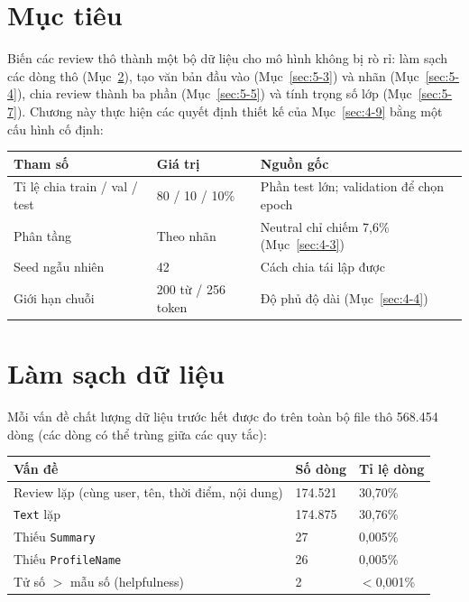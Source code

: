 \section{Mục tiêu}
\label{sec:5-1}

Biến các review thô thành một bộ dữ liệu cho mô hình không bị rò rỉ: làm sạch các dòng thô (Mục~\ref{sec:5-2}), tạo văn bản đầu vào (Mục~\ref{sec:5-3}) và nhãn (Mục~\ref{sec:5-4}), chia review thành ba phần (Mục~\ref{sec:5-5}) và tính trọng số lớp (Mục~\ref{sec:5-7}). Chương này thực hiện các quyết định thiết kế của Mục~\ref{sec:4-9} bằng một cấu hình cố định:

\begin{center}
\begin{tabular}{@{}p{5.2cm}p{3cm}p{5.8cm}@{}}
    \toprule
    Tham số & Giá trị & Nguồn gốc \\
    \midrule
    Tỉ lệ chia train / val / test & 80 / 10 / 10\% & Phần test lớn; validation để chọn epoch \\
    Phân tầng & Theo nhãn & Neutral chỉ chiếm 7,6\% (Mục~\ref{sec:4-3}) \\
    Seed ngẫu nhiên & 42 & Cách chia tái lập được \\
    Giới hạn chuỗi & 200 từ / 256 token & Độ phủ độ dài (Mục~\ref{sec:4-4}) \\
    \bottomrule
\end{tabular}
\end{center}

\section{Làm sạch dữ liệu}
\label{sec:5-2}

Mỗi vấn đề chất lượng dữ liệu trước hết được đo trên toàn bộ file thô 568.454 dòng (các dòng có thể trùng giữa các quy tắc):

\begin{center}
\begin{tabular}{@{}p{7cm}p{3cm}p{3cm}@{}}
    \toprule
    Vấn đề & Số dòng & Tỉ lệ dòng \\
    \midrule
    Review lặp (cùng user, tên, thời điểm, nội dung) & 174.521 & 30,70\% \\
    \texttt{Text} lặp & 174.875 & 30,76\% \\
    Thiếu \texttt{Summary} & 27 & 0,005\% \\
    Thiếu \texttt{ProfileName} & 26 & 0,005\% \\
    Tử số $>$ mẫu số (helpfulness) & 2 & $<$0,001\% \\
    \bottomrule
\end{tabular}
\end{center}

